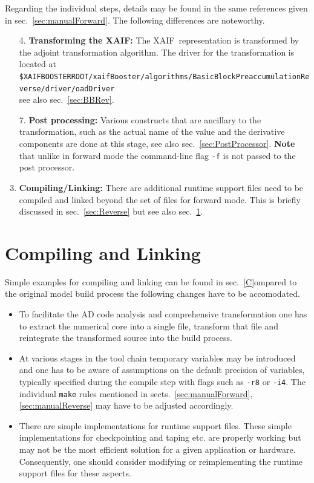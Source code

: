 \documentclass{book}
\newcommand{\xaif}{XAIF}
\newcommand{\refsec}[1]{{sec.~\ref{#1}}}
\newcommand{\refsecs}[2]{{sects.~\ref{#1},\ref{#2}}}
\begin{document}
Regarding the individual steps, details may be found in the same references given in \refsec{sec:manualForward}.
The following differences are noteworthy.
\begin{enumerate}
\item[4.]{\bf Transforming the XAIF:} The \xaif\ representation is transformed by 
the adjoint transformation algorithm. The driver for the transformation is located at\\[1ex] 
\hspace*{.3cm}\lstinline{$XAIFBOOSTERROOT/xaifBooster/algorithms/BasicBlockPreaccumulationReverse/driver/oadDriver} \\[1ex]%
see also \refsec{sec:BBRev}.
\item[7.] {\bf Post processing:} Various constructs that are ancillary to the transformation, 
such as the actual name of the value and the derivative components are done at this stage, 
see also \refsec{sec:PostProcessor}. 
{\bf Note} that unlike in forward mode the command-line flag \lstinline{-f} is not passed to 
the post processor.
\item[8.] {\bf Compiling/Linking:} There are additional runtime support files need to be compiled and linked 
beyond the set of files for forward mode. 
This is briefly discussed in \refsec{sec:Reverse} but see also \refsec{sec:compLink}.
\end{enumerate}

\section{Compiling and Linking}\label{sec:compLink}
Simple examples for compiling and linking can be found in \refsec 
Compared to the original model build process the following changes have to be accomodated.
\begin{itemize}
\item To facilitate the AD code analysis and comprehensive transformation 
one has to extract the numerical core into a single file, transform that file and reintegrate 
the transformed source into the build process. 
\item At various stages in the tool chain temporary variables may be introduced and one 
has to be aware of assumptions on the default precision of variables, typically specified during the 
compile step with flags such as \lstinline{-r8} or \lstinline{-i4}. The individual 
\lstinline{make} rules mentioned in \refsecs{sec:manualForward}{sec:manualReverse} 
may have to be adjusted accordingly.
\item There are simple implementations for runtime support files. These simple implementations 
for checkpointing and taping etc. are properly working but may not be the most efficient solution 
for a given application or hardware.  
Consequently, one should consider modifying or reimplementing the runtime support files for 
these aspects.
\end{itemize}
\end{document}
